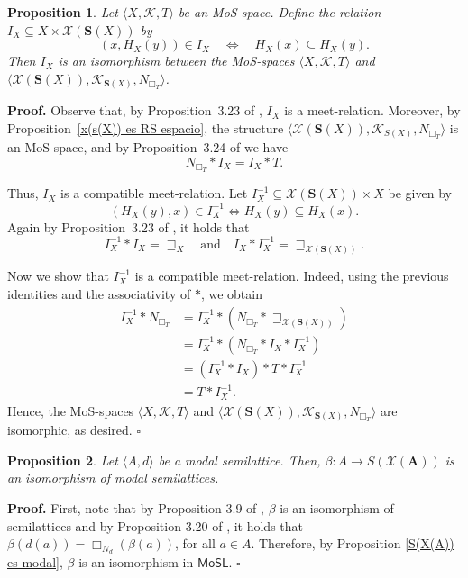 \documentclass{article}
\newtheorem{proposition}{\bf Proposition}[section]
\newenvironment{proof}
{\par\noindent\textbf{Proof. }\rm}
{\hfill$\boldsymbol{\square}$\par\vspace{0.3cm}}
\begin{document}
\begin{proposition}\label{iso rs espacios}
Let $\langle X, \mathcal{K}, T \rangle$ be an MoS-space. Define the relation $I_X \subseteq X \times \mathcal{X}(\mathbf{S}(X))$ by
\[
(x,H_X(y)) \in I_X
\quad \Longleftrightarrow \quad
H_X(x)\subseteq H_X(y).
\]
Then $I_X$ is an isomorphism between the MoS-spaces $\langle X, \mathcal{K}, T \rangle$ and $\langle \mathcal{X}(\mathbf{S}(X)), \mathcal{K}_{\mathbf{S}(X)}, N_{\Box_T}\rangle$.    
\end{proposition}
\begin{proof}
Observe that, by Proposition~3.23 of \cite{CG}, $I_X$ is a meet-relation. Moreover, by Proposition~\ref{x(s(X)) es RS espacio}, the structure $\langle \mathcal{X}(\mathbf{S}(X)), \mathcal{K}_{S(X)}, N_{\Box_T} \rangle$ is an MoS-space, and by Proposition~3.24 of \cite{CG} we have
\[
N_{\Box_T} * I_X = I_X * T.
\]

Thus, $I_X$ is a compatible meet-relation. Let $I_X^{-1} \subseteq \mathcal{X}(\mathbf{S}(X)) \times X$ be given by
\[
(H_X(y),x) \in I_X^{-1} \iff H_X(y) \subseteq H_X(x).
\]
Again by Proposition~3.23 of \cite{CG}, it holds that
\[
I_X^{-1} * I_X = \sqsupseteq_X
\quad \text{and} \quad
I_X * I_X^{-1} = \sqsupseteq_{\mathcal{X}(\mathbf{S}(X))}.
\]

Now we show that $I_X^{-1}$ is a compatible meet-relation. Indeed,  using the previous identities and the associativity of $*$, we obtain
\begin{align*}
I_X^{-1} * N_{\Box_T}
&= I_X^{-1} * (N_{\Box_T} * \sqsupseteq_{\mathcal{X}(\mathbf{S}(X))}) \\
&= I_X^{-1} * (N_{\Box_T} * I_X * I_X^{-1}) \\
&= (I_X^{-1} * I_X) * T * I_X^{-1} \\
&= T * I_X^{-1}.
\end{align*}
Hence, the MoS-spaces $\langle X, \mathcal{K}, T \rangle$ and $\langle \mathcal{X}(\mathbf{S}(X)), \mathcal{K}_{\mathbf{S}(X)}, N_{\Box_T}\rangle$ are isomorphic, as desired.
\end{proof}
\begin{proposition}\label{iso modal semir}
    Let $\langle A,d\rangle$ be a modal semilattice. Then, $\beta \colon A \rightarrow S(\mathcal{X}(\mathbf{A}))$ is an isomorphism of modal semilattices. 
\end{proposition}
\begin{proof}
First, note that by Proposition 3.9 of \cite{CG}, $\beta$  is an isomorphism of semilattices and by Proposition 3.20 of \cite{CG}, it holds that $\beta(d(a))=\Box_{N_d}(\beta(a))$, for all $a \in A$. Therefore, by Proposition \ref{S(X(A)) es modal}, $\beta$ is an isomorphism in $\mathsf{MoSL}$. 
\end{proof}
\end{document}

